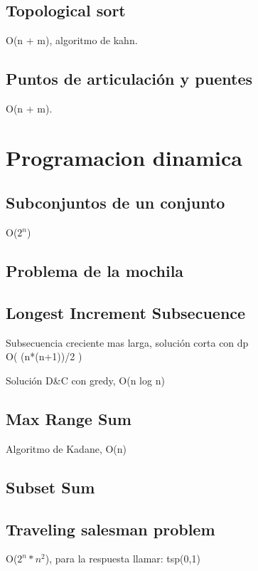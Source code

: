 \documentclass[10pt,landscape,twocolumn,a4paper,notitlepage]{article}
\newcommand\cppfile[2][]{

}
\begin{document}
			\subsection{Topological sort}
			O(n + m), algoritmo de kahn.
			\cppfile[7-30]{grafos/topological_sort_para_grafos_ciclicos.cpp}
			\subsection{Puntos de articulación y puentes}
			O(n + m).
			\cppfile[9-33]{grafos/puntos_de_articulacion_y_puentes.cpp}
			
		\section{Programacion dinamica}
			\subsection{Subconjuntos de un conjunto}
			O($2^{n}$)
			\cppfile[6-17]{programacion_dinamica/bitmask.cpp}
			\subsection{Problema de la mochila}
			\cppfile[8-23]{programacion_dinamica/knapsack.cpp}
			\subsection{Longest Increment Subsecuence}
			Subsecuencia creciente mas larga, solución corta con dp\\
			O( (n*(n+1))/2 )
			\cppfile[40-51]{programacion_dinamica/longest_increasing_subsequence.cpp}
			Solución D{\&}C con gredy, O(n log n)
			\cppfile[7-38]{programacion_dinamica/longest_increasing_subsequence.cpp}
			\subsection{Max Range Sum}
			Algoritmo de Kadane, O(n)
			\cppfile[6-22]{programacion_dinamica/Max_Range_Sum.cpp}
			\subsection{Subset Sum}
			\cppfile[8-20]{programacion_dinamica/Subset_Sum.cpp}
			\subsection{Traveling salesman problem}
			O($2^{n}*n^{2}$), para la respuesta llamar: tsp(0,1)
			\cppfile[7-22]{programacion_dinamica/traveling_salesman_problem.cpp}
		
\end{document}
